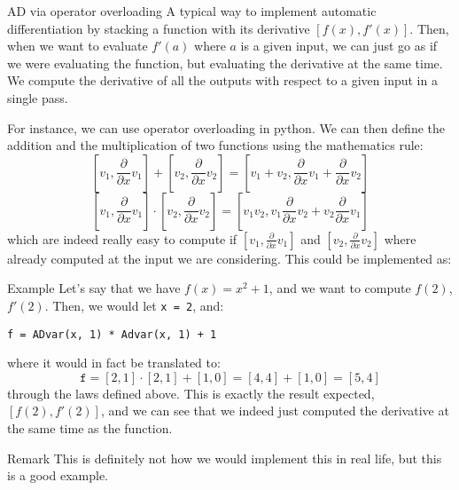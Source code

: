 \documentclass[a4paper]{article}
\begin{document}
\begin{parag}{AD via operator overloading}
    A typical way to implement automatic differentiation by stacking a function with its derivative $\left[f\left(x\right), f'\left(x\right)\right]$. Then, when we want to evaluate $f'\left(a\right)$ where $a$ is a given input, we can just go as if we were evaluating the function, but evaluating the derivative at the same time. We compute the derivative of all the outputs with respect to a given input in a single pass.

    For instance, we can use operator overloading in python. We can then define the addition and the multiplication of two functions using the mathematics rule:
    \[\left[v_1, \frac{\partial }{\partial x} v_1\right] + \left[v_{2}, \frac{\partial }{\partial x} v_2\right] = \left[v_1 + v_2, \frac{\partial }{\partial x} v_1 + \frac{\partial }{\partial x} v_2\right]\]
    \[\left[v_1, \frac{\partial }{\partial x} v_1\right] \cdot \left[v_{2}, \frac{\partial }{\partial x} v_2\right] = \left[v_1 v_2, v_1 \frac{\partial }{\partial x} v_2 + v_2 \frac{\partial }{\partial x} v_1\right]\]
    which are indeed really easy to compute if $\left[v_1, \frac{\partial }{\partial x} v_1\right]$ and $\left[v_2, \frac{\partial }{\partial x} v_2\right]$ where already computed at the input we are considering. This could be implemented as:
    
    \begin{subparag}{Example}
        Let's say that we have $f\left(x\right) = x^2 + 1$, and we want to compute $f\left(2\right)$, $f'\left(2\right)$. Then, we would let \texttt{x = 2}, and: 
        \begin{center}
            \texttt{f = ADvar(x, 1) * Advar(x, 1) + 1} 
        \end{center}
        where it would in fact be translated to: 
        \[\texttt{f} = \left[2, 1\right] \cdot \left[2, 1\right] + \left[1, 0\right] = \left[4, 4\right] + \left[1, 0\right] = \left[5, 4\right]\]
        through the laws defined above. This is exactly the result expected, $\left[f\left(2\right), f'\left(2\right)\right]$, and we can see that we indeed just computed the derivative at the same time as the function.
    \end{subparag}
    
    \begin{subparag}{Remark}
        This is definitely not how we would implement this in real life, but this is a good example.
    \end{subparag}
\end{parag}
\end{document}

